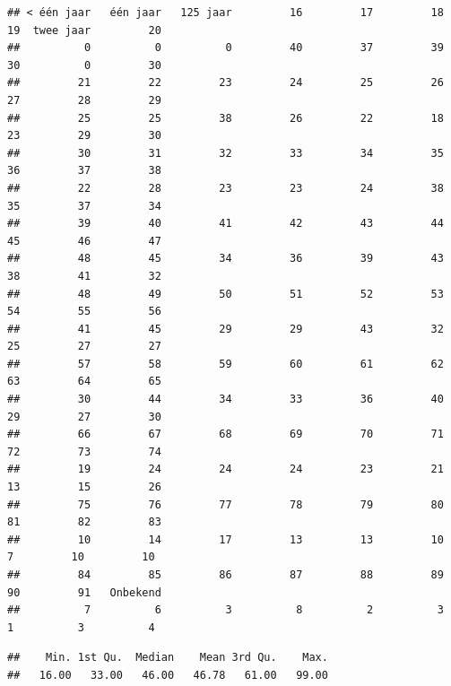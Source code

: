 \documentclass[
]{book}
\newenvironment{Shaded}{\begin{snugshade}}{\end{snugshade}}
\newcommand{\KeywordTok}[1]{\textcolor[rgb]{0.13,0.29,0.53}{\textbf{#1}}}
\newcommand{\NormalTok}[1]{#1}
\newcommand{\OperatorTok}[1]{\textcolor[rgb]{0.81,0.36,0.00}{\textbf{#1}}}
\begin{document}
\begin{verbatim}
## < één jaar   één jaar   125 jaar         16         17         18         19  twee jaar         20 
##          0          0          0         40         37         39         30          0         30 
##         21         22         23         24         25         26         27         28         29 
##         25         25         38         26         22         18         23         29         30 
##         30         31         32         33         34         35         36         37         38 
##         22         28         23         23         24         38         35         37         34 
##         39         40         41         42         43         44         45         46         47 
##         48         45         34         36         39         43         38         41         32 
##         48         49         50         51         52         53         54         55         56 
##         41         45         29         29         43         32         25         27         27 
##         57         58         59         60         61         62         63         64         65 
##         30         44         34         33         36         40         29         27         30 
##         66         67         68         69         70         71         72         73         74 
##         19         24         24         24         23         21         13         15         26 
##         75         76         77         78         79         80         81         82         83 
##         10         14         17         13         13         10          7         10         10 
##         84         85         86         87         88         89         90         91   Onbekend 
##          7          6          3          8          2          3          1          3          4
\end{verbatim}

\begin{Shaded}
\end{Shaded}

\begin{verbatim}
##    Min. 1st Qu.  Median    Mean 3rd Qu.    Max. 
##   16.00   33.00   46.00   46.78   61.00   99.00
\end{verbatim}
\end{document}
